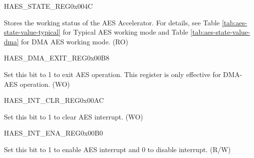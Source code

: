 \begin{register}{H}{AES\_STATE\_REG}{0x004C}\label{regdesc:AESSTATEREG}
%
%
\regnewline%
\begin{regdesc}\begin{reglist}
\item [AES\_STATE] Stores the working status of the AES Accelerator. For details, see Table \ref{tab:aes-state-value-typical} for Typical AES working mode and Table  \ref{tab:aes-state-value-dma} for DMA AES working mode. (RO) 
\end{reglist}\end{regdesc}
\end{register}


\begin{register}{H}{AES\_DMA\_EXIT\_REG}{0x00B8}\label{regdesc:AESDMAEXITREG}
%
%
\regnewline%
\begin{regdesc}\begin{reglist}
\item [AES\_DMA\_EXIT] Set this bit to 1 to exit AES operation. This register is only effective for DMA-AES operation. (WO)
\end{reglist}\end{regdesc}
\end{register}


\begin{register}{H}{AES\_INT\_CLR\_REG}{0x00AC}\label{regdesc:AESINTCLRREG}
%
%
\regnewline%
\begin{regdesc}\begin{reglist}
\item [AES\_INT\_CLR] Set this bit to 1 to clear AES interrupt. (WO)
\end{reglist}\end{regdesc}
\end{register}


\begin{register}{H}{AES\_INT\_ENA\_REG}{0x00B0}\label{regdesc:AESINTENAREG}
%
%
\regnewline%
\begin{regdesc}\begin{reglist}
\item [AES\_INT\_ENA] Set this bit to 1 to enable AES interrupt and 0 to disable interrupt. (R/W)
\end{reglist}\end{regdesc}
\end{register}
